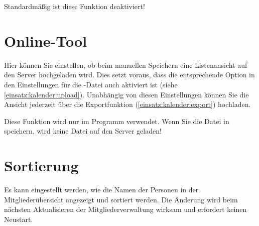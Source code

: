 Standardmäßig ist diese Funktion deaktiviert!



\section{Online-Tool}
Hier können Sie einstellen, ob beim manuellen Speichern eine Listenansicht auf den Server hochgeladen wird.
Dies setzt voraus, dass die entsprechende Option in den Einstellungen für die \EPL-Datei auch aktiviert ist
(siehe \cref{einsatz:kalender:upload}).
Unabhängig von diesen Einstellungen können Sie die Ansicht jederzeit über die Exportfunktion (\cref{einsatz:kalender:export}) hochladen.

\begin{hinweis}
  Diese Funktion wird nur im Programm \Einsatz verwendet.
  Wenn Sie die Datei in \Personal speichern,
  wird keine Datei auf den Server geladen!
\end{hinweis}


\section{Sortierung}
Es kann eingestellt werden, wie die Namen der Personen in der Mitgliederübersicht angezeigt und sortiert werden.
Die Änderung wird beim nächsten Aktualisieren der Mitgliederverwaltung wirksam und erfordert keinen Neustart.
